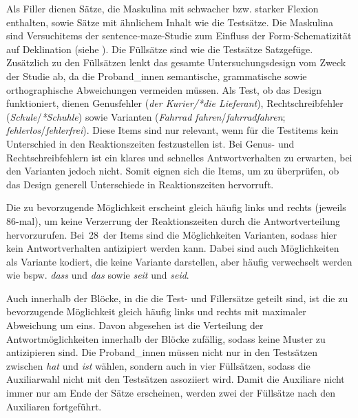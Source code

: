 Als Filler dienen Sätze, die Maskulina mit schwacher bzw. starker Flexion enthalten, sowie Sätze mit ähnlichem Inhalt wie die Testsätze. Die Maskulina sind Versuch\-items der sentence-maze-Studie zum Einfluss der Form-Schematizität auf Deklination (siehe ). Die Füllsätze sind wie die Testsätze Satzgefüge. Zusätzlich zu den Füllsätzen lenkt das gesamte Untersuchungsdesign vom Zweck der Studie ab, da die Proband\_innen semantische, grammatische sowie orthographische Abweichungen vermeiden müssen. Als Test, ob das Design funktioniert, dienen Genusfehler (\textit{der Kurier/*die Lieferant}), Rechtschreibfehler (\textit{Schule}/\textit{*Schuhle}) sowie Varianten (\textit{Fahrrad fahren}/\textit{fahrradfahren}; \textit{fehlerlos}/\textit{fehlerfrei}). Diese Items sind nur relevant, wenn für die Testitems kein Unterschied in den Reaktionszeiten festzustellen ist. Bei Genus- und Rechtschreibfehlern ist ein klares und schnelles Antwortverhalten zu erwarten, bei den Varianten jedoch nicht. Somit eignen sich die Items, um zu überprüfen, ob das Design generell Unterschiede in Reaktionszeiten hervorruft.

Die zu bevorzugende Möglichkeit erscheint  gleich häufig links und rechts (jeweils 86-mal), um keine Verzerrung der Reaktionszeiten durch die Antwortverteilung hervorzurufen. Bei~28~der Items sind die Möglichkeiten Varianten, sodass hier kein Antwortverhalten antizipiert werden kann. Dabei sind auch Möglichkeiten als Variante kodiert, die keine Variante darstellen, aber häufig verwechselt werden wie bspw. \textit{dass} und \textit{das} sowie \textit{seit} und \textit{seid}. 


Auch innerhalb der Blöcke, in die die Test- und Fillersätze geteilt sind, ist die zu bevorzugende Möglichkeit gleich häufig links und rechts mit maximaler Abweichung um eins. Davon abgesehen ist die Verteilung der Antwortmöglichkeiten innerhalb der Blöcke zufällig, sodass keine Muster zu antizipieren sind. Die Proband\_innen müssen nicht  nur in den Testsätzen zwischen  \textit{hat} und \textit{ist} wählen, sondern auch in vier Füllsätzen, sodass die Auxiliarwahl nicht mit den Testsätzen assoziiert wird. Damit die Auxiliare nicht immer nur am Ende der Sätze erscheinen, werden zwei der Füllsätze nach den Auxiliaren fortgeführt. 



